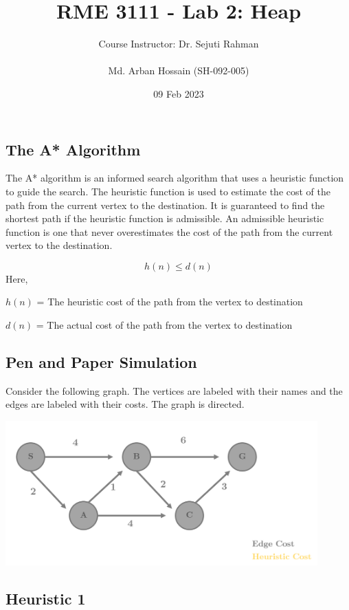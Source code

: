 \documentclass[12pt]{article}
\title{RME 3111 - Lab 2: Heap}
\author{
    Course Instructor: Dr. Sejuti Rahman\\
    \\
    Md. Arban Hossain (SH-092-005)\\
    }
\date{09 Feb 2023}
\begin{document}

\maketitle


\subsection*{The A* Algorithm}
The A* algorithm is an informed search algorithm that uses a heuristic function to guide the search. The heuristic function is used to estimate the cost of the path from the current vertex to the destination. It is guaranteed to find the shortest path if the heuristic function is admissible. An admissible heuristic function is one that never overestimates the cost of the path from the current vertex to the destination.

\[ h(n) \leq d(n) \]
\noindent
Here,

$h(n)$ = The heuristic cost of the path from the vertex to destination

$d(n)$ = The actual cost of the path from the vertex to destination


\subsection*{Pen and Paper Simulation}

Consider the following graph. The vertices are labeled with their names and the edges are labeled with their costs. The graph is directed.

\begin{center}
  \includegraphics[width=0.9\textwidth]{Graph.png}
\end{center}

\subsection*{Heuristic 1}
\end{document}
